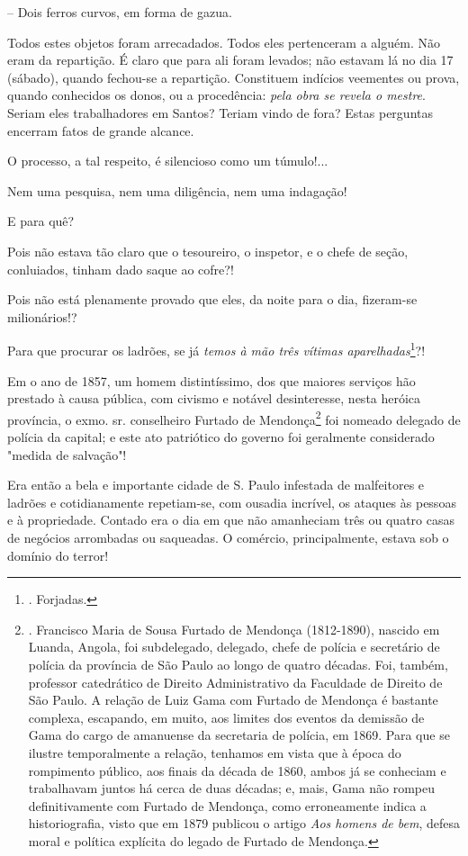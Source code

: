 -- Dois ferros curvos, em forma de gazua.

Todos estes objetos foram arrecadados. Todos eles pertenceram a alguém.
Não eram da repartição. É claro que para ali foram levados; não estavam
lá no dia 17 (sábado), quando fechou-se a repartição. Constituem
indícios veementes ou prova, quando conhecidos os donos, ou a
procedência: \emph{pela obra se revela o mestre}. Seriam eles
trabalhadores em Santos? Teriam vindo de fora? Estas perguntas encerram
fatos de grande alcance.

O processo, a tal respeito, é silencioso como um túmulo!...

Nem uma pesquisa, nem uma diligência, nem uma indagação!

E para quê?

Pois não estava tão claro que o tesoureiro, o inspetor, e o chefe de
seção, conluiados, tinham dado saque ao cofre?!

Pois não está plenamente provado que eles, da noite para o dia,
fizeram-se milionários!?

Para que procurar os ladrões, se já \emph{temos à mão três vítimas
aparelhadas}\footnote{. Forjadas.}?!

Em o ano de 1857, um homem distintíssimo, dos que maiores serviços hão
prestado à causa pública, com civismo e notável desinteresse, nesta
heróica província, o exmo. sr. conselheiro Furtado de Mendonça\footnote{.
  Francisco Maria de Sousa Furtado de Mendonça (1812-1890), nascido em
  Luanda, Angola, foi subdelegado, delegado, chefe de polícia e
  secretário de polícia da província de São Paulo ao longo de quatro
  décadas. Foi, também, professor catedrático de Direito Administrativo
  da Faculdade de Direito de São Paulo. A relação de Luiz Gama com
  Furtado de Mendonça é bastante complexa, escapando, em muito, aos
  limites dos eventos da demissão de Gama do cargo de amanuense da
  secretaria de polícia, em 1869. Para que se ilustre temporalmente a
  relação, tenhamos em vista que à época do rompimento público, aos
  finais da década de 1860, ambos já se conheciam e trabalhavam juntos
  há cerca de duas décadas; e, mais, Gama não rompeu definitivamente com
  Furtado de Mendonça, como erroneamente indica a historiografia, visto
  que em 1879 publicou o artigo \emph{Aos homens de bem}, defesa moral e
  política explícita do legado de Furtado de Mendonça.} foi nomeado
delegado de polícia da capital; e este ato patriótico do governo foi
geralmente considerado "medida de salvação"!

Era então a bela e importante cidade de S. Paulo infestada de
malfeitores e ladrões e cotidianamente repetiam-se, com ousadia
incrível, os ataques às pessoas e à propriedade. Contado era o dia em
que não amanheciam três ou quatro casas de negócios arrombadas ou
saqueadas. O comércio, principalmente, estava sob o domínio do terror!

